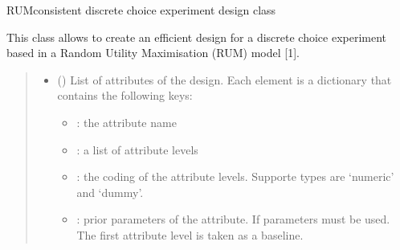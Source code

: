 \documentclass[a4paper,10pt,english]{sphinxhowto}
\begin{document}
\begin{fulllineitems}
\label{\detokenize{generated/choicedesign.design:choicedesign.design.RUMDesign}}
\pysigstartsignatures
{}
\pysigstopsignatures
\sphinxAtStartPar
RUM\sphinxhyphen{}consistent discrete choice experiment design class

\sphinxAtStartPar
This class allows to create an efficient design for a discrete choice
experiment based in a Random Utility Maximisation (RUM) model {[}1{]}.
\begin{quote}\begin{description}
\begin{itemize}
\item {} 
\sphinxAtStartPar
{} (\sphinxstyleliteralemphasis{\sphinxupquote{{[}}}\sphinxstyleliteralemphasis{\sphinxupquote{{]}}}) \textendash{} 
\sphinxAtStartPar
List of attributes of the design. Each element is a dictionary that
contains the following keys:
\begin{itemize}
\item {} 
\sphinxAtStartPar
{}: the attribute name

\item {} 
\sphinxAtStartPar
{}: a list of attribute levels

\item {} 
\sphinxAtStartPar
{}: the coding of the attribute levels. Supporte types are
‘numeric’ and ‘dummy’.

\item {} 
\sphinxAtStartPar
{}: prior parameters of the attribute. If  parameters must be used. The first attribute level is
taken as a baseline.


\end{itemize}
\end{itemize}
\end{description}
\end{quote}
\end{fulllineitems}
\end{document}
